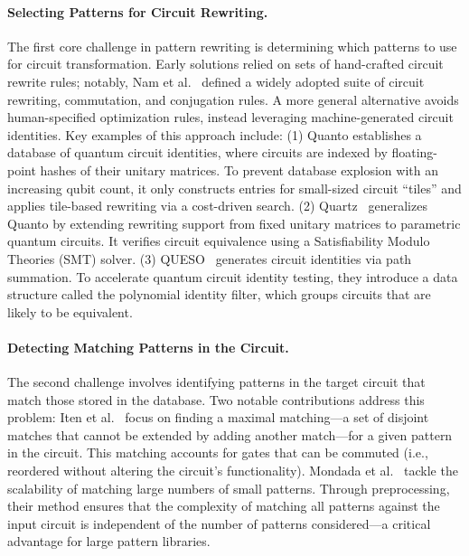 \documentclass[a4paper,onecolumn,11pt,unpublished]{quantumarticle}
\begin{document}
\paragraph{Selecting Patterns for Circuit Rewriting.} The first core challenge in pattern rewriting is determining which patterns to use for circuit transformation. Early solutions relied on sets of hand-crafted circuit rewrite rules; notably, Nam et al.~\cite{Nam2018Automated} defined a widely adopted suite of circuit rewriting, commutation, and conjugation rules. A more general alternative avoids human-specified optimization rules, instead leveraging machine-generated circuit identities. Key examples of this approach include: (1) Quanto\cite{Pointing2021Quanto} establishes a database of quantum circuit identities, where circuits are indexed by floating-point hashes of their unitary matrices. To prevent database explosion with an increasing qubit count, it only constructs entries for small-sized circuit ``tiles'' and applies tile-based rewriting via a cost-driven search.
(2) Quartz~\cite{Xu2022Quartz} generalizes Quanto by extending rewriting support from fixed unitary matrices to parametric quantum circuits. It verifies circuit equivalence using a Satisfiability Modulo Theories (SMT) solver.
(3) QUESO~\cite{xuSynthesizingQuantumCircuitOptimizers2023} generates circuit identities via path summation. To accelerate quantum circuit identity testing, they introduce a data structure called the polynomial identity filter, which groups circuits that are likely to be equivalent.

\paragraph{Detecting Matching Patterns in the Circuit.} The second challenge involves identifying patterns in the target circuit that match those stored in the database. Two notable contributions address this problem: Iten et al.~\cite{itenExactPracticalPattern2022} focus on finding a maximal matching---a set of disjoint matches that cannot be extended by adding another match---for a given pattern in the circuit. This matching accounts for gates that can be commuted (i.e., reordered without altering the circuit's functionality). Mondada et al.~\cite{mondadaScalablePatternMatching2025} tackle the scalability of matching large numbers of small patterns. Through preprocessing, their method ensures that the complexity of matching all patterns against the input circuit is independent of the number of patterns considered---a critical advantage for large pattern libraries.
\end{document}
